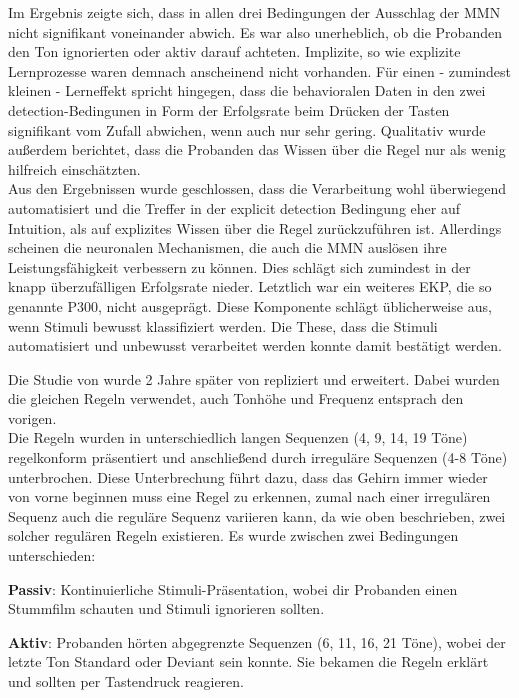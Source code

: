 \documentclass[doc,a4paper,12pt]{apa6}
\begin{document}
Im Ergebnis zeigte sich, dass in allen drei Bedingungen der Ausschlag der MMN nicht signifikant voneinander abwich. Es war also unerheblich, ob die Probanden den Ton ignorierten oder aktiv darauf achteten. Implizite, so wie explizite Lernprozesse waren demnach anscheinend nicht vorhanden. Für einen - zumindest kleinen - Lerneffekt spricht hingegen, dass die behavioralen Daten in den zwei detection-Bedingunen in Form der Erfolgsrate beim Drücken der Tasten signifikant vom Zufall abwichen, wenn auch nur sehr gering. Qualitativ wurde außerdem berichtet, dass die Probanden das Wissen über die Regel nur als wenig hilfreich einschätzten.\\
Aus den Ergebnissen wurde geschlossen, dass die Verarbeitung wohl überwiegend automatisiert und die Treffer in der explicit detection Bedingung eher auf Intuition, als auf explizites Wissen über die Regel zurückzuführen ist. Allerdings scheinen die neuronalen Mechanismen, die auch die MMN auslösen ihre Leistungsfähigkeit verbessern zu können. Dies schlägt sich zumindest in der knapp überzufälligen Erfolgsrate nieder. Letztlich war ein weiteres EKP, die so genannte P300, nicht ausgeprägt. Diese Komponente schlägt üblicherweise aus, wenn Stimuli bewusst klassifiziert werden. Die These, dass die Stimuli automatisiert und unbewusst verarbeitet werden konnte damit bestätigt werden.

Die Studie von \textcite{paavilainen2007preattentive} wurde 2 Jahre später von \textcite{bendixen2008rapid} repliziert und erweitert. Dabei wurden die gleichen Regeln verwendet, auch Tonhöhe und Frequenz entsprach den vorigen.\\
Die Regeln wurden in unterschiedlich langen Sequenzen (4, 9, 14, 19 Töne) regelkonform präsentiert und anschließend durch irreguläre Sequenzen (4-8 Töne) unterbrochen. Diese Unterbrechung führt dazu, dass das Gehirn immer wieder von vorne beginnen muss eine Regel zu erkennen, zumal nach einer irregulären Sequenz auch die reguläre Sequenz variieren kann, da wie oben beschrieben, zwei solcher regulären Regeln existieren. Es wurde zwischen zwei Bedingungen unterschieden:

\begin{compactitem}
  \item \textbf{Passiv}: Kontinuierliche Stimuli-Präsentation, wobei dir Probanden einen Stummfilm schauten und Stimuli ignorieren sollten.
  \item \textbf{Aktiv}: Probanden hörten abgegrenzte Sequenzen (6, 11, 16, 21 Töne), wobei der letzte Ton Standard oder Deviant sein konnte. Sie bekamen die Regeln erklärt und sollten per Tastendruck reagieren.
\end{compactitem}
\end{document}

